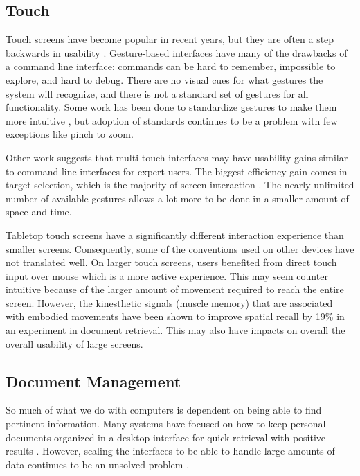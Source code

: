 \documentclass{article}
\begin{document}
\subsection{Touch}
Touch screens have become popular in recent years, but they are often a step backwards in usability \cite{Norman2010}.  Gesture-based interfaces have many of the drawbacks of a command line interface: commands can be hard to remember, impossible to explore, and hard to debug.  There are no visual cues for what gestures the system will recognize, and there is not a standard set of gestures for all functionality.   Some work has been done to standardize gestures to make them more intuitive \cite{North2009}, but adoption of standards continues to be a problem with few exceptions like pinch to zoom.  

	Other work suggests that multi-touch interfaces may have usability gains similar to command-line interfaces for expert users\cite{Forlines2007}\cite{Tan2002}\cite{North2009}. The biggest efficiency gain comes in target selection, which is the majority of screen interaction \cite{Forlines2007}.  The nearly unlimited number of available gestures allows a lot more to be done in a smaller amount of space and time.  
	
	Tabletop touch screens have a significantly different interaction experience than smaller screens.  Consequently, some of the conventions used on other devices have not translated well.  On larger touch screens, users benefited from direct touch input over mouse which is a more active experience\cite{Kristensson2008}.  This may seem counter intuitive because of the larger amount of movement required to reach the entire screen. However, the kinesthetic signals (muscle memory) that are associated with embodied movements have been shown to improve spatial recall by 19\% in an experiment in document retrieval\cite{Tan2002}. This may also have impacts on overall the overall usability of large screens.


\subsection{Document Management}

So much of what we do with computers is dependent on being able to find pertinent information.  Many systems have focused on how to keep personal documents organized in a desktop interface for quick retrieval with positive results \cite{Agarawala2006} \cite{Foo2007:ECDL} \cite{Foo2007:ICADL}. However, scaling the interfaces to be able to handle large amounts of data continues to be an unsolved problem \cite{Whittaker2001}.
\end{document}
